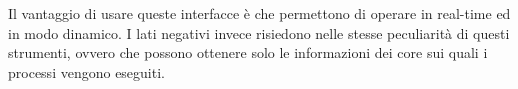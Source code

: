 Il vantaggio di usare queste interfacce è che permettono di operare in real-time ed in modo dinamico. I lati negativi invece risiedono nelle stesse peculiarità di questi strumenti, ovvero che possono ottenere solo le informazioni dei core sui quali i processi vengono eseguiti. 



